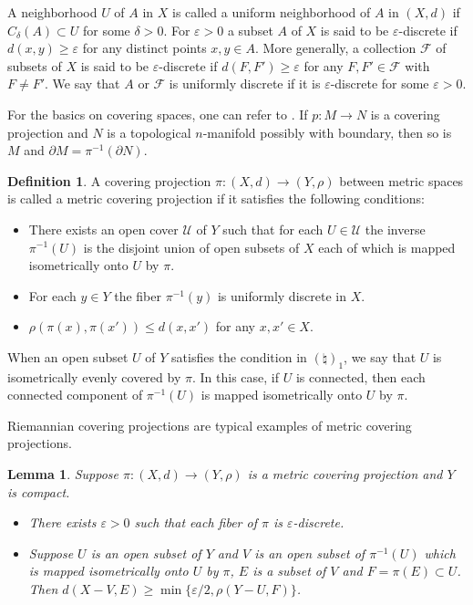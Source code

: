 \documentclass[11pt, fleqn]{amsart}
\newtheorem{lemma}{Lemma}[section]
\theoremstyle{definition}
\newtheorem{defn}{Definition}[section]
\newcommand{\cal}{\mathcal}
\newcommand{\e}{\varepsilon}
\newcommand{\F}{\mathcal F}
\begin{document}
A neighborhood $U$ of $A$ in $X$ is called a uniform neighborhood of $A$ in $(X, d)$ 
if $C_\delta(A) \subset U$ for some $\delta >0$. 
For $\e > 0$ a subset $A$ of $X$ is said to be $\e$-discrete if 
$d(x,y) \geq \e$ for any distinct points $x, y \in A$. 
More generally, a collection ${\cal F}$ of subsets of $X$ 
is said to be $\e$-discrete if $d(F, F') \geq \e$ for any $F, F' \in \F$ with $F \neq F'$. 
We say that $A$ or $\F$ is uniformly discrete if it is $\e$-discrete for some $\e > 0$. 

For the basics on covering spaces, one can refer to \cite[Chapter 2, Section 1]{Sp}.
If $p : M \to N$ is a covering projection and $N$ is a topological $n$-manifold possibly with boundary, then so is $M$ and $\partial M = \pi^{-1}(\partial N)$. 

\begin{defn} A covering projection $\pi : (X, d) \to (Y, \rho)$ between metric spaces is called a metric covering projection 
if it satisfies the following conditions: 
\begin{itemize} 
\item[$(\natural)_1$] There exists an open cover ${\cal U}$ of $Y$ such that for each $U \in {\cal U}$ the inverse $\pi^{-1}(U)$ is the disjoint union of open subsets of $X$ each of which is mapped isometrically onto $U$ by $\pi$. 
\item[$(\natural)_2$] For each $y \in Y$ the fiber $\pi^{-1}(y)$ is uniformly discrete in $X$. 
\item[$(\natural)_3$] $\rho(\pi(x), \pi(x')) \leq d(x, x')$ for any $x, x' \in X$. 
\end{itemize}
\end{defn}

When an open subset $U$ of $Y$ satisfies the condition in $(\natural)_1$, 
we say that $U$ is isometrically evenly covered by $\pi$. 
In this case, if $U$ is connected, then each connected component of $\pi^{-1}(U)$ is mapped isometrically onto $U$ by $\pi$. 

Riemannian covering projections are typical examples of metric covering projections. 

\begin{lemma}\label{lemma_covering_proj}
Suppose $\pi : (X, d) \to (Y, \rho)$ is a metric covering projection and $Y$ is compact. 
\begin{itemize}
\item[(1)] There exists $\e > 0$ such that each fiber of $\pi$ is $\e$-discrete.
\item[(2)] Suppose $U$ is an open subset of $Y$ and $V$ is an open subset of $\pi^{-1}(U)$ which is mapped isometrically onto $U$ by $\pi$, 
$E$ is a subset of $V$ and $F = \pi(E) \subset U$. 
Then $d(X - V, E) \geq \min \{ \e/2, \rho(Y - U, F) \}$. 
\end{itemize} 
\end{lemma} 
\end{document}

